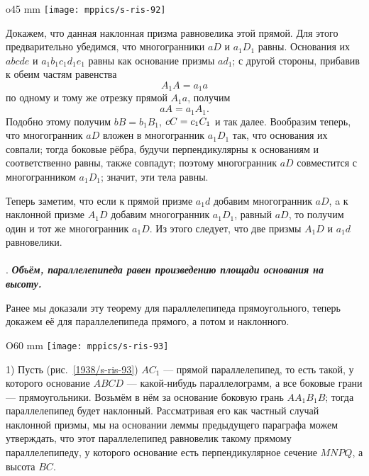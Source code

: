 \begin{wrapfigure}{o}{45 mm}
\vskip-4mm
\centering
\texttt{[image: mppics/s-ris-92]}
\caption{}\label{1938/s-ris-92}
\vskip-0mm
\end{wrapfigure}

Докажем, что данная наклонная призма равновелика этой прямой.
Для этого предварительно убедимся, что многогранники $aD$ и $a_1D_1$ равны.
Основания их $abcde$ и $a_1b_1c_1d_1e_1$ равны как основание призмы $ad_1$;
с другой стороны, прибавив к обеим частям равенства 
\[A_1A=a_1a\] по одному и тому же отрезку прямой $A_1a$, получим 
\[aA=a_1A_1.\] 
Подобно этому получим $bB=b_1B_1$, $cC\z=c_1C_1$ и так далее.
Вообразим теперь, что многогранник $aD$ вложен в многогранник $a_1D_1$ так, что основания их совпали;
тогда боковые рёбра, будучи перпендикулярны к основаниям и соответственно равны, также совпадут;
поэтому многогранник $aD$ совместится с многогранником $a_1D_1$;
значит, эти тела равны.

Теперь заметим, что если к прямой призме $a_1d$ добавим многогранник $aD$,
a к наклонной призме $A_1D$ добавим многогранник $a_1D_1$, равный $aD$, то получим один и тот же многогранник $a_1D$.
Из этого следует, что две призмы $A_1D$ и $a_1d$ равновелики.

\paragraph{}\label{1938/s87}
.
\textbf{\emph{Объём, параллелепипеда равен произведению площади основания на высоту.}}

Ранее мы доказали эту теорему для параллелепипеда прямоугольного, теперь докажем её для параллелепипеда прямого, а потом и наклонного.

\begin{wrapfigure}{O}{60 mm}
\vskip-0mm
\centering
\texttt{[image: mppics/s-ris-93]}
\caption{}\label{1938/s-ris-93}
\vskip-0mm
\end{wrapfigure}

1) Пусть (рис.~\ref{1938/s-ris-93}) $AC_1$ — прямой параллелепипед, то есть такой, у которого основание $ABCD$ — какой-нибудь параллелограмм, а все боковые грани — прямоугольники.
Возьмём в нём за основание боковую грань $AA_1B_1B$;
тогда параллелепипед будет наклонный.
Рассматривая его как частный случай наклонной призмы, мы на основании леммы предыдущего параграфа можем утверждать, что этот параллелепипед равновелик такому прямому параллелепипеду, у которого основание есть перпендикулярное сечение $MNPQ$, а высота $BC$.

